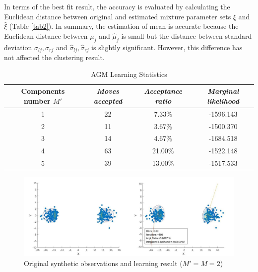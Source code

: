 \documentclass[conference]{IEEEtran}
\begin{document}
In terms of the best fit result, the accuracy is evaluated by calculating the Euclidean distance between original and estimated mixture parameter sets $\xi$ and $\hat{\xi}$ (Table \ref{tab2}). In summary, the estimation of mean is accurate because the Euclidean distance between $\mu_j$ and $\hat{\mu}_j$ is small but the distance between standard deviation $\sigma_{lj}, \sigma_{rj}$ and $\hat{\sigma}_{lj}, \hat{\sigma}_{rj}$ is slightly significant. However, this difference has not affected the clustering result.

 
\begin{table}
\caption{AGM Learning Statistics}
\begin{center}
\begin{tabular}{|c|c|c|c|}
\hline
\multicolumn{1}{|p{2cm}|}{\centering \textbf{Components number $M'$}} & \multicolumn{1}{|p{2cm}|}{\centering \textbf{\textit{Moves accepted}}} & \multicolumn{1}{|p{2cm}|}{\centering \textbf{\textit{Acceptance ratio}}} & \multicolumn{1}{|p{2cm}|}{\centering \textbf{\textit{Marginal likelihood}}}\\
\hline
1 & 22 & 7.33\% & -1596.143  \\
2 & 11 & 3.67\% & -1500.370 \\
3 & 14 & 4.67\% & -1684.518 \\
4 & 63 & 21.00\% & -1522.148 \\
5 & 39 & 13.00\% & -1517.533 \\
\hline
\end{tabular}
\label{tab1}
\end{center}
\end{table}

\bigskip

\begin{figure}
\centering
\includegraphics[width=0.6\paperwidth]{02.jpg}
\caption{Original synthetic observations and learning result ($M' = M = 2$)}
\label{fig:1}
\end{figure}

\bigskip
\end{document}
